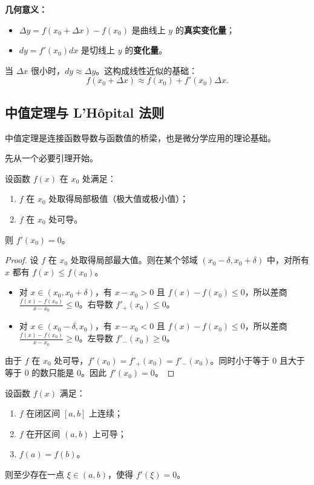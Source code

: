 \textbf{几何意义：}
\begin{itemize}
    \item $\Delta y=f(x_0+\Delta x)-f(x_0)$ 是曲线上 $y$ 的\textbf{真实变化量}；
    \item $dy=f'(x_0)dx$ 是切线上 $y$ 的\textbf{变化量}。
\end{itemize}
当 $\Delta x$ 很小时，$dy\approx \Delta y$。这构成线性近似的基础：
\[
f(x_0+\Delta x)\approx f(x_0)+f'(x_0)\Delta x.
\]

\subsection{中值定理与 L'Hôpital 法则}

中值定理是连接函数导数与函数值的桥梁，也是微分学应用的理论基础。

先从一个必要引理开始。

\begin{theorem}[Fermat 定理]
设函数 $f(x)$ 在 $x_0$ 处满足：
\begin{enumerate}
    \item $f$ 在 $x_0$ 处取得局部极值（极大值或极小值）；
    \item $f$ 在 $x_0$ 处可导。
\end{enumerate}
则 $f'(x_0)=0$。
\end{theorem}

\begin{proof}
设 $f$ 在 $x_0$ 处取得局部最大值。则在某个邻域 $(x_0-\delta,x_0+\delta)$ 中，对所有 $x$ 都有 $f(x)\le f(x_0)$。
\begin{itemize}
    \item 对 $x\in (x_0,x_0+\delta)$，有 $x-x_0>0$ 且 $f(x)-f(x_0)\le 0$，所以差商 $\frac{f(x)-f(x_0)}{x-x_0}\le 0$。右导数 $f'_+(x_0)\le 0$。
    \item 对 $x\in (x_0-\delta,x_0)$，有 $x-x_0<0$ 且 $f(x)-f(x_0)\le 0$，所以差商 $\frac{f(x)-f(x_0)}{x-x_0}\ge 0$。左导数 $f'_-(x_0)\ge 0$。
\end{itemize}
由于 $f$ 在 $x_0$ 处可导，$f'(x_0)=f'_+(x_0)=f'_-(x_0)$。同时小于等于 $0$ 且大于等于 $0$ 的数只能是 $0$。因此 $f'(x_0)=0$。
\end{proof}

\begin{theorem}[Rolle 定理]
\label{thm:rolle_cn}
设函数 $f(x)$ 满足：
\begin{enumerate}
    \item $f$ 在闭区间 $[a,b]$ 上连续；
    \item $f$ 在开区间 $(a,b)$ 上可导；
    \item $f(a)=f(b)$。
\end{enumerate}
则至少存在一点 $\xi\in (a,b)$，使得 $f'(\xi)=0$。
\end{theorem}

